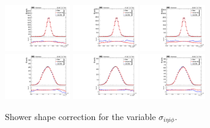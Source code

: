 \begin{figure}[htb]
	\centering
	\includegraphics[width=0.25\textwidth]{fig/ss_corr/phosieip_16_EB_Z.pdf}
	\includegraphics[width=0.25\textwidth]{fig/ss_corr/ph_sieip_17_EB_Z.pdf}
	\includegraphics[width=0.25\textwidth]{fig/ss_corr/phosieip_18_EB_Z.pdf}\\
	\includegraphics[width=0.25\textwidth]{fig/ss_corr/phosieip_16_EE_Z.pdf}
	\includegraphics[width=0.25\textwidth]{fig/ss_corr/ph_sieip_17_EE_Z.pdf}
	\includegraphics[width=0.25\textwidth]{fig/ss_corr/phosieip_18_EE_Z.pdf}\\	
	\label{fig:sieip_Z}
	\caption{Shower shape correction for the variable $\sigma_{i\eta i\phi}$.}
\end{figure}
